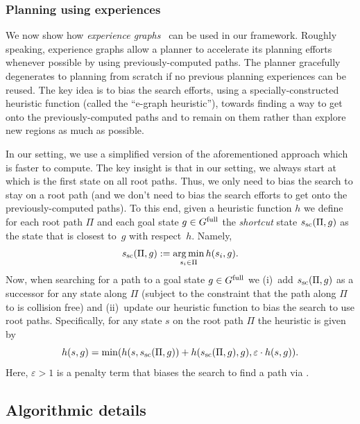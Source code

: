 \documentclass[conference]{IEEEtran}
\DeclareMathOperator*{\argmin}{arg\,min}
\begin{document}
\subsubsection{Planning using experiences}
We now show how \emph{experience graphs}~\cite{PCCL12} can be used in our framework.
%
Roughly speaking, experience graphs allow a planner  to accelerate its planning efforts whenever possible by using previously-computed paths. The planner gracefully degenerates to planning from scratch if no previous planning experiences can be reused.
%
The key idea is to bias the search efforts, using a specially-constructed heuristic function (called the ``e-graph heuristic''), towards finding a way to get onto the previously-computed paths and to remain on them rather than explore new regions as much as possible. 

In our setting, we use a simplified version of the aforementioned approach which is faster to compute.
%
The key insight is that in our setting, we always start at \Shome which is the first state on all root paths. Thus, we only need to bias the search to stay on a root path (and we don't need to bias the search efforts to get onto the previously-computed paths).
%
To this end, given a heuristic function $h$ we define for each root path $\Pi$ and each goal state $g \in G^{\textrm{full}}$ the \emph{shortcut} state $s_{\textrm{sc}} (\Pi,g)$ as the   state that is closest to~$g$ with respect~$h$.
Namely,
$$
\Ssc (\Pi,g) := \argmin\limits_{s_i \in \Pi} h(s_i, g).
$$
Now, when searching for a path to a goal state $g \in G^{\textrm{full}}$ we
(i)~add $s_{\textrm{sc}} (\Pi,g)$ as a successor for any state along $\Pi$
(subject to the constraint that the path along $\Pi$ to \Ssc is collision free)
and
(ii)~update our heuristic function to bias the search to use root paths. Specifically, for any state $s$ on the root path $\Pi$ the heuristic is given by
$$
h(s,g) = \min(h(s,s_{\textrm{sc}} (\Pi,g)) + h(s_{\textrm{sc}} (\Pi,g),g), \varepsilon \cdot h(s,g)).
$$
Here, $\varepsilon>1$ is a penalty term that biases the search to find a path via \Ssc.





\subsection{Algorithmic details}
\end{document}
